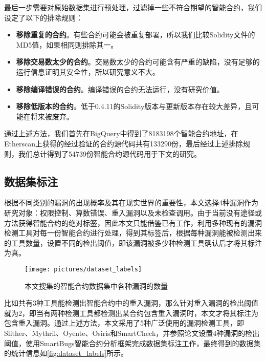最后一步需要对原始数据集进行预处理，过滤掉一些不符合期望的智能合约，我们设定了以下的排除规则：
\begin{itemize}
    \item \textbf{移除重复的合约}。有些合约可能会被重复部署，所以我们比较Solidity文件的MD5值，如果相同则排除其一。
    \item \textbf{移除交易数太少的合约}。交易数太少的合约可能含有严重的缺陷，没有足够的运行信息证明其安全性，所以研究意义不大。
    \item \textbf{移除编译错误的合约}。编译错误的合约无法运行，没有研究价值。
    \item \textbf{移除低版本的合约}。低于0.4.11的Solidity版本与更新版本存在较大差异，且可能在将来被废弃。
\end{itemize}

通过上述方法，我们首先在BigQuery中得到了\num{8183198}个智能合约地址，在Etherscan上获得的经过验证的合约源代码共有\num{133290}份，最后经过上述排除规则，我们总计得到了\num{54739}份智能合约源代码用于下文的研究。
\subsection{数据集标注}
\label{sec:数据集标注}
根据不同类别的漏洞的出现概率及其在现实世界的重要性，本文选择4种漏洞作为研究对象：权限控制、算数错误、重入漏洞以及未检查调用。由于当前没有途径或方法获得智能合约的绝对标签，因此本文只能借鉴已有工作\cite{yashavant2022scrawld}，利用多种现有的漏洞检测工具对每一份智能合约进行处理，得到其标签后，根据每种漏洞能被检测出来的工具数量，设置不同的检出阈值，即该漏洞被多少种检测工具确认后才将其标注为真。
\begin{figure}[htbp]
    \centering
    \texttt{[image: pictures/dataset\_labels]}
    \caption{\label{fig:dataset_labels}本文搜集的智能合约数据集中各种漏洞的数量}
\end{figure}
比如共有3种工具能检测出智能合约中的重入漏洞，那么针对重入漏洞的检出阈值就为2，即当有两种检测工具都检测出某合约包含重入漏洞时，本文才将其标注为包含重入漏洞。通过上述方法，本文采用了5种广泛使用的漏洞检测工具，即Slither、Mythril、Oyente、Osiris和SmartCheck，并参照论文\cite{yashavant2022scrawld}设置4种漏洞的检出阈值，使用SmartBugs智能合约分析框架\cite{smartbugs}完成数据集标注工作，最终得到的数据集的统计信息如\autoref{fig:dataset_labels}所示。


